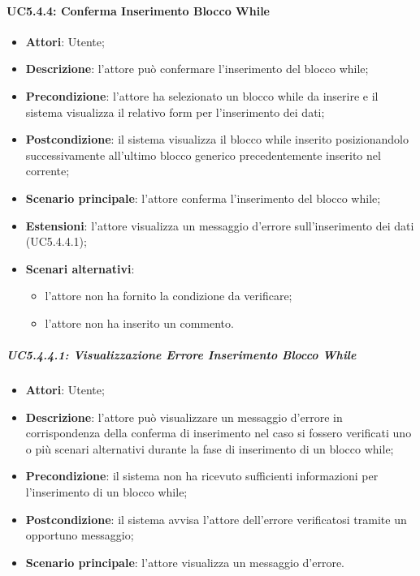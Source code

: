 \paragraph{UC5.4.4: Conferma Inserimento Blocco While}
\label{UC5.4.4}
\begin{itemize}
\item \textbf{Attori}: Utente;
\item \textbf{Descrizione}: l'attore può confermare l'inserimento del blocco while;	
\item \textbf{Precondizione}: l'attore ha selezionato un blocco while da inserire e il sistema visualizza il relativo form per l'inserimento dei dati;	
\item \textbf{Postcondizione}: il sistema visualizza il blocco while inserito posizionandolo successivamente all'ultimo blocco generico precedentemente inserito nel  corrente;	
\item \textbf{Scenario principale}:
l'attore conferma l'inserimento del blocco while;	
\item \textbf{Estensioni}:
l'attore visualizza un messaggio d'errore sull'inserimento dei dati (UC5.4.4.1);	
\item \textbf{Scenari alternativi}:
\begin{itemize}
\item l'attore non ha fornito la condizione da verificare;
\item l'attore non ha inserito un commento.
\end{itemize}
\end{itemize}

\subparagraph{UC5.4.4.1: Visualizzazione Errore Inserimento Blocco While}
\label{UC5.4.4.1}
\begin{itemize}
\item \textbf{Attori}: Utente;
\item \textbf{Descrizione}: l'attore può visualizzare un messaggio d'errore in corrispondenza della conferma di inserimento nel caso si fossero verificati uno o più scenari alternativi durante la fase di inserimento di un blocco while;	
\item \textbf{Precondizione}: il sistema non ha ricevuto sufficienti informazioni per l'inserimento di un blocco while;	
\item \textbf{Postcondizione}: il sistema avvisa l'attore dell'errore verificatosi tramite un opportuno messaggio;	
\item \textbf{Scenario principale}:
l'attore visualizza un messaggio d'errore.	
\end{itemize}

